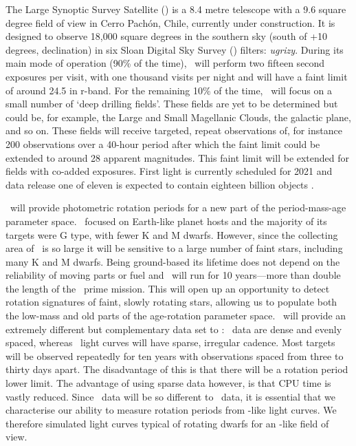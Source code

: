 The Large Synoptic Survey Satellite (\LSST) is a 8.4 metre telescope with a
9.6 square degree field of view in Cerro Pach\'{o}n, Chile, currently under
construction.
It is designed to observe 18,000 square degrees in the southern sky (south of
+10 degrees, declination) in six Sloan Digital Sky Survey (\SDSS) filters:
{\it ugrizy}.
During its main mode of operation (90\% of the time), \LSST\ will perform two
fifteen second exposures per visit, with one thousand visits per night and
will have a faint limit of around 24.5 in r-band.
For the remaining 10\% of the time, \LSST\ will focus on a small number of
`deep drilling fields'.
These fields are yet to be determined but could be, for example, the Large and
Small Magellanic Clouds, the galactic plane, and so on.
These fields will receive targeted, repeat observations of, for instance 200
observations over a 40-hour period after which the faint limit could be
extended to around 28 apparent magnitudes.
This faint limit will be extended for fields with co-added exposures.
First light is currently scheduled for 2021 and data release one of eleven is
expected to contain eighteen billion objects \citep{Ivezic2008}.

\LSST\ will provide photometric rotation periods for a new part of the
period-mass-age parameter space.
\kepler\ focused on Earth-like planet hosts and the majority of its targets
were G type, with fewer K and M dwarfs.
However, since the collecting area of \LSST\ is so large it will be sensitive
to a large number of faint stars, including many K and M dwarfs.
Being ground-based its lifetime does not depend on the reliability of moving
parts or fuel and \LSST\ will run for 10 years---more than double the length
of the \kepler\ prime mission.
This will open up an opportunity to detect rotation signatures of faint,
slowly rotating stars, allowing us to populate both the low-mass and old parts
of the age-rotation parameter space.
\LSST\ will provide an extremely different but complementary data set to
\kepler: \kepler\ data are dense and evenly spaced, whereas \LSST\ light curves
will have sparse, irregular cadence.
Most targets will be observed repeatedly for ten years with observations
spaced from three to thirty days apart.
The disadvantage of this is that there will be a rotation period lower limit.
The advantage of using sparse data however, is that CPU time is vastly
reduced.
Since \LSST\ data will be so different to \kepler\ data, it is essential that
we characterise our ability to measure rotation periods from \LSST-like light
curves.
We therefore simulated light curves typical of rotating dwarfs for an
\LSST-like field of view.

